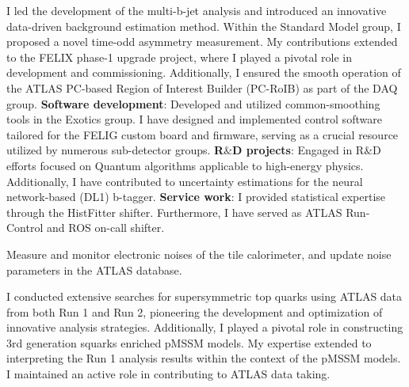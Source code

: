  \begin{cventries}   
  \end{cventries}
  \vspace{-1cm}
   \parbox{0.9\linewidth}{
      \leftskip=0.5in
       I led the development of the multi-b-jet analysis and introduced an innovative data-driven 
       background estimation method. Within the Standard Model group, I proposed a novel time-odd
       asymmetry measurement. My contributions extended to the FELIX phase-1 upgrade project, where
       I played a pivotal role in development and commissioning. Additionally, I ensured the smooth
       operation of the ATLAS PC-based Region of Interest Builder (PC-RoIB) as part of the DAQ group. \newline
        \textbf{Software development}: Developed and utilized common-smoothing tools in the Exotics group.
        I have designed and implemented control software tailored for the FELIG custom board and firmware,
        serving as a crucial resource utilized by numerous sub-detector groups. \newline
        \textbf{R$\&$D projects}: Engaged in R$\&$D efforts focused on Quantum algorithms applicable to high-energy physics.
        Additionally, I have contributed to uncertainty estimations for the neural network-based (DL1) b-tagger. \newline
        \textbf{Service work}: I provided statistical expertise through the HistFitter shifter. 
        Furthermore, I have served as  ATLAS Run-Control and ROS on-call shifter.
    }
    

\begin{cventries}
\end{cventries}
    \vspace{-1cm}
    \parbox{0.9\linewidth}{
      \leftskip=0.5in
        Measure and monitor electronic noises of the tile calorimeter, and update noise parameters in the  ATLAS database.
    }
\begin{cventries}
\end{cventries}
    \vspace{-1cm}
     \parbox{0.9\linewidth}{
      \leftskip=0.5in
        I conducted extensive searches for supersymmetric top quarks using ATLAS data 
        from both Run 1 and Run 2, pioneering the development and optimization of innovative
        analysis strategies. Additionally, I played a pivotal role in constructing 
        3rd generation squarks enriched pMSSM models. My expertise extended to interpreting
        the Run 1 analysis results within the context of the pMSSM models. I maintained an active
        role in contributing to ATLAS data taking.

      }
